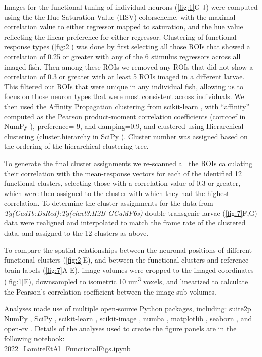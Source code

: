 \documentclass[9pt,lineno]{RandlettLab_elife}
\begin{document}
Images for the functional tuning of individual neurons (\autoref{fig:1}G-J) were computed using the the Hue Saturation Value (HSV) colorscheme, with the maximal correlation value to either regressor mapped to saturation, and the hue value reflecting the linear preference for either regressor. Clustering of functional response types (\autoref{fig:2}) was done by first selecting all those ROIs that showed a correlation of 0.25 or greater with any of the 6 stimulus regressors across all imaged fish. Then among these ROIs we removed any ROIs that did not show a correlation of 0.3 or greater with at least 5 ROIs imaged in a different larvae. This filtered out ROIs that were unique in any individual fish, allowing us to focus on those neuron types that were most consistent across individuals. We then used the Affinity Propagation clustering from scikit-learn \citep{Pedregosa2011-dj}, with “affinity” computed as the Pearson product-moment correlation coefficients (corrcoef in NumPy \citep{Harris2020-bg}), preference=-9, and damping=0.9, and clustered using Hierarchical clustering (cluster.hierarchy in SciPy \citep{Virtanen2020-sz}). Cluster number was assigned based on the ordering of the hierarchical clustering tree. 

To generate the final cluster assignments we re-scanned all the ROIs calculating their correlation with the mean-response vectors for each of the identified 12 functional clusters, selecting those with a correlation value of 0.3 or greater, which were then assigned to the cluster with which they had the highest correlation. To determine the cluster assignments for the data from \emph{Tg(Gad1b:DsRed);Tg(elavl3:H2B-GCaMP6s)} double transgenic larvae (\autoref{fig:7}F,G) data were realigned and interpolated to match the frame rate of the clustered data, and assigned to the 12 clusters as above. 

To compare the spatial relationships between the neuronal positions of different functional clusters (\autoref{fig:2}E), and between the functional clusters and reference brain labels (\autoref{fig:7}A-E), image volumes were cropped to the imaged coordinates (\autoref{fig:1}E), downsampled to isometric 10 um\textsuperscript{3} voxels, and linearized to calculate the Pearson's correlation coefficient between the image sub-volumes. 

Analyses made use of multiple open-source Python packages, including:
suite2p \citep{Pachitariu2017-ad}
NumPy \citep{Harris2020-bg}, SciPy \citep{Virtanen2020-sz}, scikit-learn \citep{Pedregosa2011-dj}, scikit-image \citep{Van_der_Walt2014-hx}, numba \citep{Lam2015-pq}, matplotlib \citep{Hunter2007-ub}, seaborn \citep{Waskom2021-ah}, and open-cv \citep{Bradski2000-qo}.
 Details of the analyses used to create the figure panels are in the following notebook: 
 \\ \href{https://nbviewer.org/github/owenrandlett/lamire_2022/blob/main/2022_LamireEtAl_FunctionalFigs.ipynb}{2022\_LamireEtAl\_FunctionalFigs.ipynb}
\end{document}
